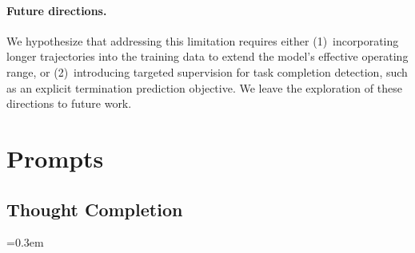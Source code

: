 \documentclass{article} %
\begin{document}
\paragraph{Future directions.}
We hypothesize that addressing this limitation requires either (1)~incorporating longer trajectories into the training data to extend the model's effective operating range, or (2)~introducing targeted supervision for task completion detection, such as an explicit termination prediction objective. We leave the exploration of these directions to future work.


\newpage
\section{Prompts}
\label{appendix: prompts}
\subsection{Thought Completion}
\label{appendix: thought completion}



\setlength{\parindent}{0pt}

\spaceskip=0.3em
\end{document}
